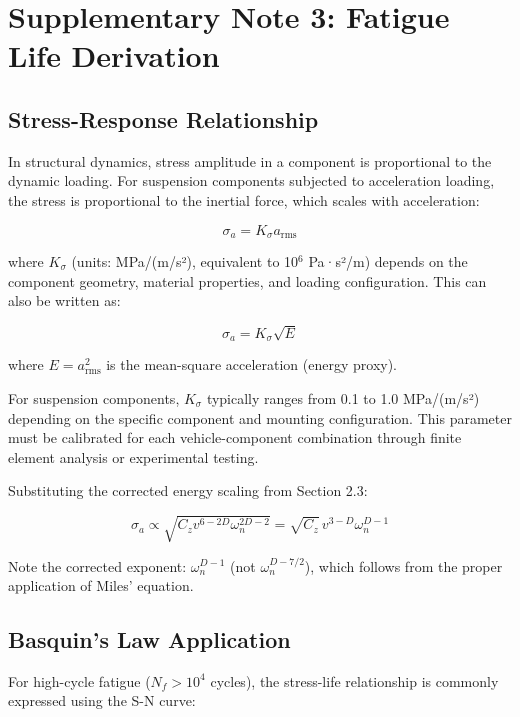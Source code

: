 \documentclass[11pt,letterpaper]{article}
\begin{document}
\section{Supplementary Note 3: Fatigue Life Derivation}

\subsection{Stress-Response Relationship}

In structural dynamics, stress amplitude in a component is proportional to the dynamic loading. For suspension components subjected to acceleration loading, the stress is proportional to the inertial force, which scales with acceleration:

\begin{equation}
\sigma_a = K_\sigma a_{\text{rms}}
\end{equation}

where $K_\sigma$ (units: MPa/(m/s²), equivalent to 10$^6$ Pa·s²/m) depends on the component geometry, material properties, and loading configuration. This can also be written as:

\begin{equation}
\sigma_a = K_\sigma \sqrt{E}
\end{equation}

where $E = a_{\text{rms}}^2$ is the mean-square acceleration (energy proxy).

For suspension components, $K_\sigma$ typically ranges from 0.1 to 1.0 MPa/(m/s²) depending on the specific component and mounting configuration. This parameter must be calibrated for each vehicle-component combination through finite element analysis or experimental testing.

Substituting the corrected energy scaling from Section 2.3:

\begin{equation}
\sigma_a \propto \sqrt{C_z v^{6-2D} \omega_n^{2D-2}} = \sqrt{C_z} \, v^{3-D} \omega_n^{D-1}
\end{equation}

Note the corrected exponent: $\omega_n^{D-1}$ (not $\omega_n^{D-7/2}$), which follows from the proper application of Miles' equation.

\subsection{Basquin's Law Application}

For high-cycle fatigue ($N_f > 10^4$ cycles), the stress-life relationship is commonly expressed using the S-N curve:
\end{document}
